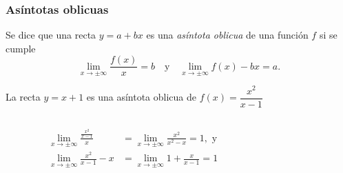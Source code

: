 \begin{frame}
\frametitle{Asíntotas oblicuas}
\begin{definicion}
Se dice que una recta $y=a+bx$ es una \emph{asíntota oblicua} de una función $f$ si se cumple
\[
\lim_{x\rightarrow \pm\infty}\frac{f(x)}{x}=b \quad \textrm{y} \quad \lim_{x\rightarrow \pm\infty}f(x)-bx=a.
\]
\end{definicion}

 La recta $y=x+1$ es una asíntota oblicua de $f(x)=\dfrac{x^2}{x-1}$
\begin{columns}
\begin{column}{0.5\textwidth}
\begin{align*}
\lim_{x\rightarrow \pm\infty}\frac{\frac{x^2}{x-1}}{x}&=
\lim_{x\rightarrow \pm\infty}\frac{x^2}{x^2-x} = 1, \textrm{ y}\\
\lim_{x\rightarrow \pm\infty}\frac{x^2}{x-1}-x &=
\lim_{x\rightarrow \pm\infty}1+\frac{x}{x-1} = 1
\end{align*}
\end{column}
\begin{column}{0.5\textwidth}
\begin{center}
\scalebox{1}{}
\end{center}
\end{column}
\end{columns}
\end{frame}



